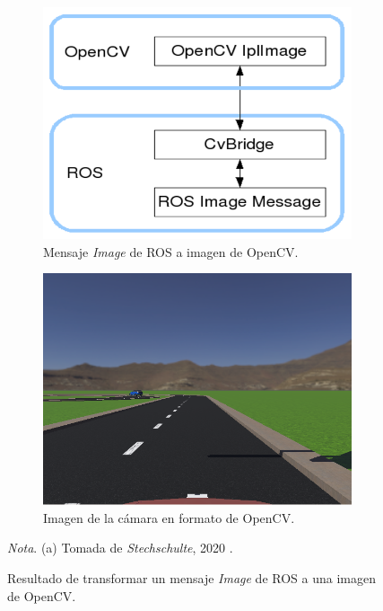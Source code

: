 \begin{figure}
    \centering
    \begin{subfigure}[b]{0.4\textwidth}
         \centering
        \includegraphics[width=\textwidth]{Figures/Figures_Cap04/cvbridge.png}
        \caption{Mensaje \textit{Image} de ROS a imagen de OpenCV.}
        \label{fig:cv_bridge}
    \end{subfigure}
    \hfill
    \begin{subfigure}[b]{0.4\textwidth}
        \centering
        \includegraphics[width=\textwidth]{Figures/Figures_Cap04/lanes.png}
        \caption{Imagen de la cámara en formato de OpenCV.}
        \label{fig:lanes_cv}
    \end{subfigure}
    \caption{Resultado de transformar un mensaje \textit{Image} de ROS a una imagen de OpenCV.}
    \textit{Nota}. (a) Tomada de \textit{Stechschulte}, 2020 \cite{cv_bridge}.
    \label{fig:ros_cv}
\end{figure}

